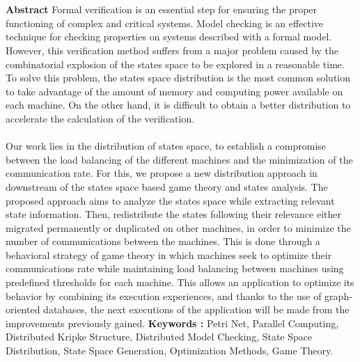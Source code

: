 \chapter*{}
\begin{changemargin}{3mm}{0cm}
	\begin{minipage}[c]{0.96\columnwidth} 
		{\LARGE\textbf{Abstract}}
		\vskip1mm
		\begingroup
		Formal verification is an essential step for ensuring the proper functioning of complex and critical systems. Model checking is an effective technique for checking properties on systems described with a formal model. However, this verification method suffers from a major problem caused by the combinatorial explosion of the states space to be explored in a reasonable time.
		\\
		
		To solve this problem, the states space distribution is the most common solution to take advantage of the amount of memory and computing power available on each machine. On the other hand, it is difficult to obtain a better distribution to accelerate the calculation of the verification.
		\\\\
		Our work lies in the distribution of states space, to establish a compromise between the load balancing of the different machines and the minimization of the communication rate. For this, we propose a new distribution approach in downstream of the states space based game theory and states analysis. The proposed approach aims to analyze the states space while extracting relevant state information. Then, redistribute the states following their relevance either migrated permanently or duplicated on other machines, in order to minimize the number of communications between the machines. This is done through a behavioral strategy of game theory in which machines seek to optimize their communications rate while maintaining load balancing between machines using predefined thresholds for each machine. This allows an application to optimize its behavior by combining its execution experiences, and thanks to the use of graph-oriented databases, the next executions of the application will be made from the improvements previously gained.		
		\endgroup
		\vskip1mm
		{\textbf{Keywords : }
			\begingroup			
			Petri Net, Parallel Computing, Distributed Kripke Structure, Distributed Model Checking, State Space Distribution,	State Space Generation, Optimization Methods, Game Theory.
			\endgroup
		}
    \end{minipage}    
\end{changemargin}